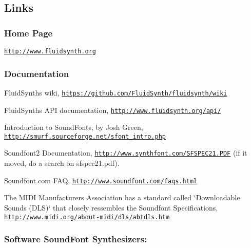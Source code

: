 \subsection*{Links}

\subsubsection*{Home Page}


\begin{DoxyItemize}
\item \href{http://www.fluidsynth.org}{\tt http\+://www.\+fluidsynth.\+org}
\end{DoxyItemize}

\subsubsection*{Documentation}


\begin{DoxyItemize}
\item Fluid\+Synth\textquotesingle{}s wiki, \href{https://github.com/FluidSynth/fluidsynth/wiki}{\tt https\+://github.\+com/\+Fluid\+Synth/fluidsynth/wiki}
\item Fluid\+Synth\textquotesingle{}s A\+PI documentation, \href{http://www.fluidsynth.org/api/}{\tt http\+://www.\+fluidsynth.\+org/api/}
\item Introduction to Sound\+Fonts, by Josh Green, \href{http://smurf.sourceforge.net/sfont_intro.php}{\tt http\+://smurf.\+sourceforge.\+net/sfont\+\_\+intro.\+php}
\item Soundfont2 Documentation, \href{http://www.synthfont.com/SFSPEC21.PDF}{\tt http\+://www.\+synthfont.\+com/\+S\+F\+S\+P\+E\+C21.\+P\+DF} (if it moved, do a search on sfspec21.\+pdf).
\item Soundfont.\+com F\+AQ, \href{http://www.soundfont.com/faqs.html}{\tt http\+://www.\+soundfont.\+com/faqs.\+html}
\item The M\+I\+DI Manufacturers Association has a standard called \char`\"{}\+Downloadable
  Sounds (\+D\+L\+S)\char`\"{} that closely ressembles the Soundfont Specifications, \href{http://www.midi.org/about-midi/dls/abtdls.htm}{\tt http\+://www.\+midi.\+org/about-\/midi/dls/abtdls.\+htm}
\end{DoxyItemize}

\subsubsection*{Software Sound\+Font Synthesizers\+:}


